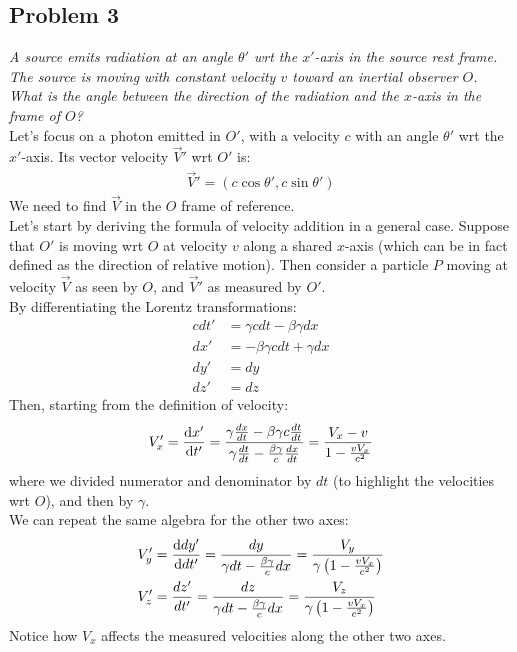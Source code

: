 \documentclass[../template.tex]{subfiles}
\begin{document}
\subsection{Problem 3}
\textit{A source emits radiation at an angle $\theta'$ wrt the $x'$-axis in the source rest frame. The source is moving with constant velocity $v$ toward an inertial observer $O$.}\\
\textit{What is the angle between the direction of the radiation and the $x$-axis in the frame of $O$?}\\

Let's focus on a photon emitted in $O'$, with a velocity $c$ with an angle $\theta'$ wrt the $x'$-axis. Its vector velocity $\vec{V}'$  wrt $O'$ is:
\begin{align*}
    \vec{V}' = (c \cos \theta', c \sin \theta')
\end{align*}
We need to find $\vec{V}$ in the $O$ frame of reference.\\

Let's start by deriving the formula of velocity addition in a general case. Suppose that $O'$ is moving wrt $O$ at velocity $v$ along a shared $x$-axis (which can be in fact defined as the direction of relative motion). Then consider a particle $P$ moving at velocity $\vec{V}$ as seen by $O$, and $\vec{V}'$ as measured by $O'$.\\
By differentiating the Lorentz transformations:
\begin{align*}
    cdt' &= \gamma c dt - \beta \gamma dx \\
    dx' &= -\beta \gamma c dt + \gamma dx \\
    dy' &=  dy \\
    dz' &=  dz
\end{align*}
Then, starting from the definition of velocity:
\begin{align*}
    V_x' = \dv{x'}{t'} = \frac{\gamma \frac{dx}{dt} - \beta \gamma c \frac{dt}{dt}  }{\gamma \frac{dt}{dt} - \frac{\beta \gamma}{c} \frac{dx}{dt}   }  = \frac{V_x - v}{1-\frac{vV_x}{c^2}}   
\end{align*}
where we divided numerator and denominator by $dt$ (to highlight the velocities wrt $O$), and then by $\gamma$.\\
We can repeat the same algebra for the other two axes:
\begin{align*}
    V_y' &=  \dv{dy'}{dt'} = \frac{dy}{\gamma dt - \frac{\beta \gamma}{c} dx } = \frac{V_y}{\gamma \left(1-\frac{v V_x}{c^2} \right)}    \\
    V_z' &= \frac{dz'}{dt'} = \frac{dz}{\gamma dt - \frac{\beta \gamma }{c} dx } = \frac{V_z}{\gamma \left(1-\frac{vV_x}{c^2} \right)}   \\
\end{align*}
Notice how $V_x$ affects the measured velocities along the other two axes.\\
\end{document}
